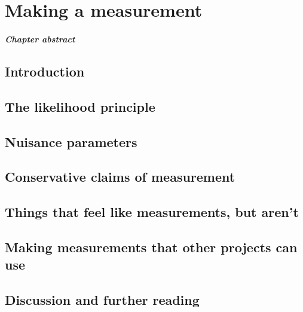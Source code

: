 
\chapter{Making a measurement}\label{ch:measurement}
\paragraph{Chapter abstract}

\section{Introduction}

\section{The likelihood principle}

\section{Nuisance parameters}

\section{Conservative claims of measurement}

\section{Things that feel like measurements, but aren't}

\section{Making measurements that other projects can use}

\section{Discussion and further reading}
